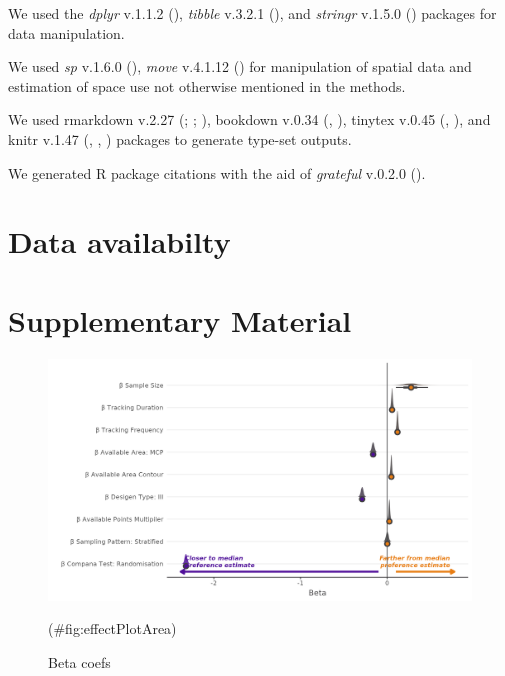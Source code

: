 \documentclass[10pt,a4paper]{article}
\begin{document}
We used the \emph{dplyr} v.1.1.2 (), \emph{tibble} v.3.2.1 (),
and \emph{stringr} v.1.5.0 () packages for data manipulation.

We used \emph{sp} v.1.6.0 (), \emph{move} v.4.1.12 () for manipulation of spatial data and estimation of space use not otherwise mentioned in the methods.

We used rmarkdown v.2.27 (; ; ), bookdown v.0.34 (, ), tinytex v.0.45 (, ), and knitr v.1.47 (, , ) packages to generate type-set outputs.

We generated R package citations with the aid of \emph{grateful} v.0.2.0 ().

\section{Data availabilty}\label{data-availabilty}

\clearpage

\section{Supplementary Material}\label{supplementary-material}

\begin{figure}
\includegraphics[width=1\linewidth]{../figures/areaBrms_effectsPlot} \caption{Beta coefs}(\#fig:effectPlotArea)
\end{figure}
\end{document}

